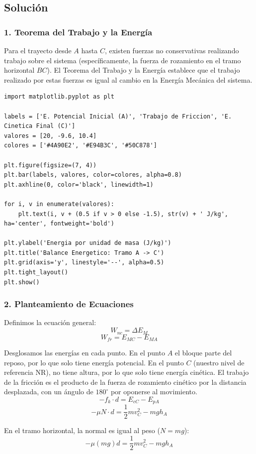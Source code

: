 \documentclass[12pt, a4paper]{article}
\begin{document}
\subsection*{Solución}

\subsubsection*{1. Teorema del Trabajo y la Energía}
Para el trayecto desde $A$ hasta $C$, existen fuerzas no conservativas realizando trabajo sobre el sistema (específicamente, la fuerza de rozamiento en el tramo horizontal $BC$). El Teorema del Trabajo y la Energía establece que el trabajo realizado por estas fuerzas es igual al cambio en la Energía Mecánica del sistema.

\begin{lstlisting}
import matplotlib.pyplot as plt

labels = ['E. Potencial Inicial (A)', 'Trabajo de Friccion', 'E. Cinetica Final (C)']
valores = [20, -9.6, 10.4]
colores = ['#4A90E2', '#E94B3C', '#50C878']

plt.figure(figsize=(7, 4))
plt.bar(labels, valores, color=colores, alpha=0.8)
plt.axhline(0, color='black', linewidth=1)

for i, v in enumerate(valores):
    plt.text(i, v + (0.5 if v > 0 else -1.5), str(v) + ' J/kg', ha='center', fontweight='bold')

plt.ylabel('Energia por unidad de masa (J/kg)')
plt.title('Balance Energetico: Tramo A -> C')
plt.grid(axis='y', linestyle='--', alpha=0.5)
plt.tight_layout()
plt.show()
\end{lstlisting}

\subsubsection*{2. Planteamiento de Ecuaciones}
Definimos la ecuación general:
$$ W_{nc} = \Delta E_M $$
$$ W_{fr} = E_{MC} - E_{MA} $$

Desglosamos las energías en cada punto. En el punto $A$ el bloque parte del reposo, por lo que solo tiene energía potencial. En el punto $C$ (nuestro nivel de referencia NR), no tiene altura, por lo que solo tiene energía cinética. El trabajo de la fricción es el producto de la fuerza de rozamiento cinético por la distancia desplazada, con un ángulo de $180^\circ$ por oponerse al movimiento.
$$ -f_k \cdot d = E_{cC} - E_{pA} $$
$$ -\mu N \cdot d = \frac{1}{2} m v_C^2 - m g h_A $$

En el tramo horizontal, la normal es igual al peso ($N = mg$):
$$ -\mu (m g) d = \frac{1}{2} m v_C^2 - m g h_A $$
\end{document}
